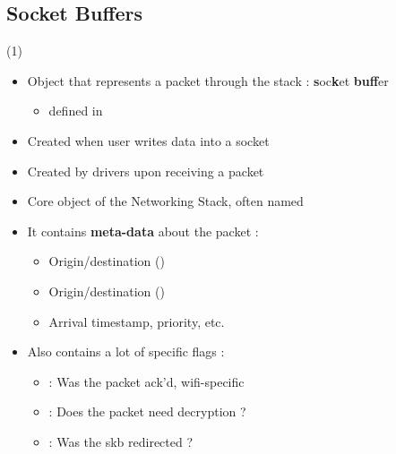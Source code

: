 \subsection{Socket Buffers}

\begin{frame}{ (1)}
	\begin{itemize}
		\item Object that represents a packet through the stack : \textbf{s}oc\textbf{k}et \textbf{buff}er
			\begin{itemize}
				\item {} defined in 
			\end{itemize}
		\item Created when user writes data into a socket
		\item Created by drivers upon receiving a packet
		\item Core object of the Networking Stack, often named 
		\item It contains \textbf{meta-data} about the packet :
			\begin{itemize}
				\item Origin/destination  ()
				\item Origin/destination  ()
				\item Arrival timestamp, priority, etc.
			\end{itemize}
		\item Also contains a lot of specific flags :
			\begin{itemize}
				\item {} : Was the packet ack'd, wifi-specific
				\item {} : Does the packet need decryption ?
				\item {} : Was the skb redirected ?
			\end{itemize}
	\end{itemize}
\end{frame}

